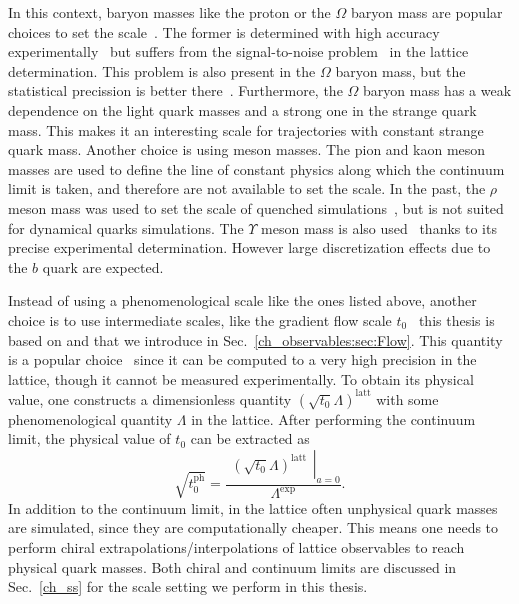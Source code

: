 In this context, baryon masses like the proton or the $\Omega$ baryon mass are popular choices to set the scale~\citep{RQCD_scale}. The former is determined with high accuracy experimentally~\citep{ParticleDataGroup:2020ssz} but suffers from the signal-to-noise problem~\citep{Lepage:1989hd,Luscher:2010ae} in the lattice determination. This problem is also present in the $\Omega$ baryon mass, but the statistical precission is better there~\citep{RQCD_scale}. Furthermore, the $\Omega$ baryon mass has a weak dependence on the light quark masses and a strong one in the strange quark mass. This makes it an interesting scale for trajectories with constant strange quark mass. Another choice is using meson masses. The pion and kaon meson masses are used to define the line of constant physics along which the continuum limit is taken, and therefore are not available to set the scale. In the past, the $\rho$ meson mass was used to set the scale of quenched simulations~\citep{Mawhinney:1996jk,Irving:1998yu,Bornyakov:2015plz}, but is not suited for dynamical quarks simulations. The $\Upsilon$ meson mass is also used~\citep{HPQCD:2011qw,Gray:2005ur} thanks to its precise experimental determination. However large discretization effects due to the $b$ quark are expected. 

Instead of using a phenomenological scale like the ones listed above, another choice is to use intermediate scales, like the gradient flow scale $t_0$~\citep{Luscher:2010we,1006.4518} this thesis is based on and that we introduce in Sec.~\ref{ch_observables:sec:Flow}. This quantity is a popular choice~\citep{Bruno:2016plf,Strassberger:2023xnj,RQCD_scale,Kostrzewa:2021syw,Hollwieser:2020qri,MILC:2015tqx} since it can be computed to a very high precision in the lattice, though it cannot be measured experimentally. To obtain its physical value, one constructs a dimensionless quantity $(\sqrt{t_0}\Lambda)^{\textrm{latt}}$ with some phenomenological quantity $\Lambda$ in the lattice. After performing the continuum limit, the physical value of $t_0$ can be extracted as
\begin{equation}
\label{ch_foundation:eq:Lambda}
\sqrt{t_0^{\textrm{ph}}}=\frac{\left.\begin{matrix}
\left(\sqrt{t_0}\Lambda\right)^{\textrm{latt}}
\end{matrix}\right|_{a=0}}{\Lambda^{\textrm{exp}}}.
\end{equation}
In addition to the continuum limit, in the lattice often unphysical quark masses are simulated, since they are computationally cheaper. This means one needs to perform chiral extrapolations/interpolations of lattice observables to reach physical quark masses. Both chiral and continuum limits are discussed in Sec.~\ref{ch_ss} for the scale setting we perform in this thesis.

